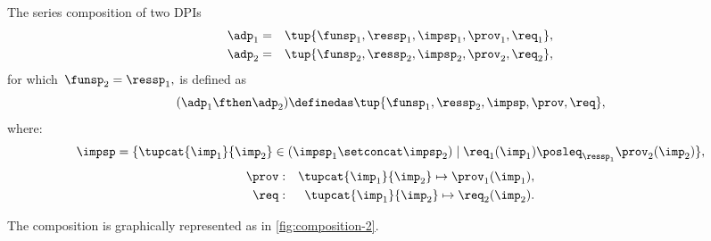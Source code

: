 \begin{definition}
    \label{def:series-composition}
    The series composition of two DPIs
    \begin{equation}
        \begin{aligned}
            \adp_{1} & = & \tup{\funsp_{1},\ressp_{1},\impsp_{1},\prov_{1},\req_{1}}, 
            \\
            \adp_{2} & = & \tup{\funsp_{2},\ressp_{2},\impsp_{2},\prov_{2},\req_{2}}, 
        \end{aligned}
    \end{equation}
    for which~$\funsp_{2}=\ressp_{1},$ is defined as
    \begin{equation}
        (\adp_{1} \fthen \adp_{2})
        \definedas
        \tup{ \funsp_{1},\ressp_{2},\impsp,\prov,\req},
    \end{equation}
    where:
    \begin{equation}
        \impsp  =  \{  \tupcat {\imp_{1}} {\imp_{2}} \in (\impsp_{1} \setconcat \impsp_{2})\mid\req_{1}(\imp_{1})\posleq_{\ressp_{1}}\prov_{2}(\imp_{2})\},
    \end{equation}
    \begin{equation}
        \begin{aligned}
            \prov & : & \tupcat {\imp_{1}} {\imp_{2}}   \mapsto\prov_{1}(\imp_{1}), \\
            \req  & : & \tupcat {\imp_{1}} {\imp_{2}} \mapsto\req_{2}(\imp_{2}).    
        \end{aligned}
    \end{equation}
\end{definition}

The composition is graphically represented as in \cref{fig:composition-2}.

\begin{marginfigure}
    \label{fig:composition-2}
    \begin{center}
    \end{center}
\end{marginfigure}

